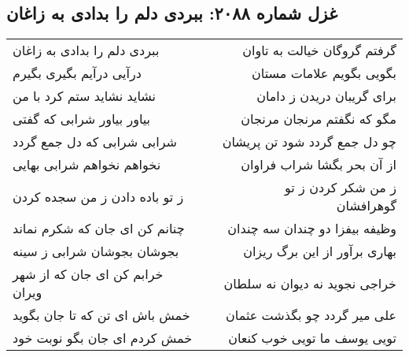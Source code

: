 \begin{center}
\section*{غزل شماره ۲۰۸۸: ببردی دلم را بدادی به زاغان}
\label{sec:2088}
\begin{longtable}{l p{0.5cm} r}
ببردی دلم را بدادی به زاغان
&&
گرفتم گروگان خیالت به تاوان
\\
درآیی درآیم بگیری بگیرم
&&
بگویی بگویم علامات مستان
\\
نشاید نشاید ستم کرد با من
&&
برای گریبان دریدن ز دامان
\\
بیاور بیاور شرابی که گفتی
&&
مگو که نگفتم مرنجان مرنجان
\\
شرابی شرابی که دل جمع گردد
&&
چو دل جمع گردد شود تن پریشان
\\
نخواهم نخواهم شرابی بهایی
&&
از آن بحر بگشا شراب فراوان
\\
ز تو باده دادن ز من سجده کردن
&&
ز من شکر کردن ز تو گوهرافشان
\\
چنانم کن ای جان که شکرم نماند
&&
وظیفه بیفزا دو چندان سه چندان
\\
بجوشان بجوشان شرابی ز سینه
&&
بهاری برآور از این برگ ریزان
\\
خرابم کن ای جان که از شهر ویران
&&
خراجی نجوید نه دیوان نه سلطان
\\
خمش باش ای تن که تا جان بگوید
&&
علی میر گردد چو بگذشت عثمان
\\
خمش کردم ای جان بگو نوبت خود
&&
تویی یوسف ما تویی خوب کنعان
\\
\end{longtable}
\end{center}
